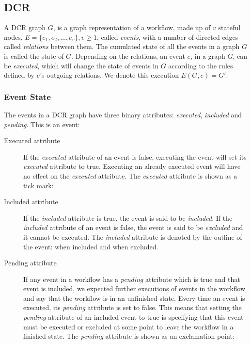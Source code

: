 \documentclass{article}
\begin{document}
	\subsection{DCR}
	\label{subsec:dcr}

	A DCR graph $G$, is a graph representation of a workflow, made up of $v$ stateful nodes, $E=\{e_1, e_2, \dots, e_v\}, v \geq 1$, called \textit{events}, with a number of directed edges called \textit{relations} between them.
	The cumulated state of all the events in a graph $G$ is called the state of $G$.
	Depending on the relations, an event $e$, in a graph $G$, can be \textit{executed}, which will change the state of events in $G$ according to the rules defined by $e$'s outgoing relations.
	We denote this execution $E(G,e)=G'$.

			\subsubsection{Event State}

			The events in a DCR graph have three binary attributes: \textit{executed}, \textit{included} and \textit{pending}.
			This is an event: 

			\begin{description}
				\item[Executed attribute] If the \textit{executed} attribute of an event is false, executing the event will set its \textit{executed} attribute to true.
				Executing an already executed event will have no effect on the \textit{executed} attribute.
				The \textit{executed} attribute is shown as a tick mark: 
				\item[Included attribute] If the \textit{included} attribute is true, the event is said to be \textit{included}.
				If the \textit{included} attribute of an event is false, the event is said to be \textit{excluded} and it cannot be executed.
				The \textit{included} attribute is denoted by the outline of the event:  when included and  when excluded.
				\item[Pending attribute] If any event in a workflow has a \textit{pending} attribute which is true and that event is included, we expected further executions of events in the workflow and say that the workflow is in an unfinished state.
				Every time an event is executed, its \textit{pending} attribute is set to false.
				This means that setting the \textit{pending} attribute of an included event to true is specifying that this event must be executed or excluded at some point to leave the workflow in a finished state.
				The \textit{pending} attribute is shown as an exclamation point: 
			\end{description}
\end{document}

